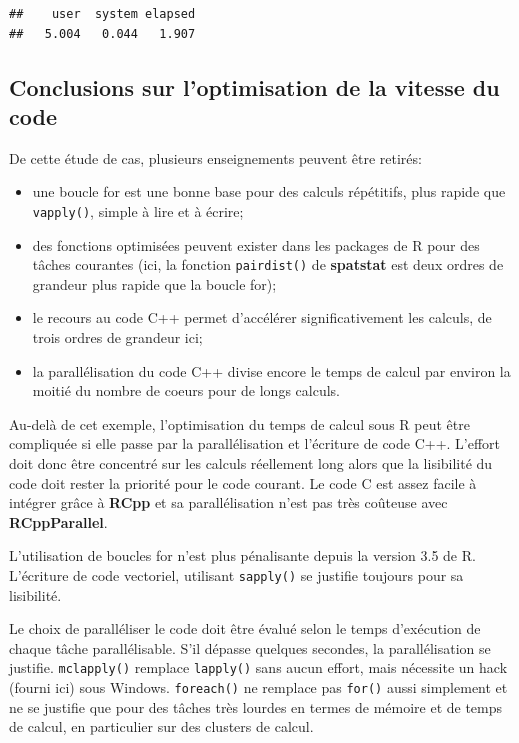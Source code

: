 \documentclass[
  12pt,
  french,
  a4paper,
  extrafontsizes,onecolumn,openright
  ]{memoir}
\providecommand{\tightlist}{%
  \setlength{\itemsep}{0pt}\setlength{\parskip}{0pt}}
\begin{document}
\begin{verbatim}
##    user  system elapsed 
##   5.004   0.044   1.907
\end{verbatim}

\normalsize

\hypertarget{conclusions-sur-loptimisation-de-la-vitesse-du-code}{%
\subsection{Conclusions sur l'optimisation de la vitesse du code}\label{conclusions-sur-loptimisation-de-la-vitesse-du-code}}

De cette étude de cas, plusieurs enseignements peuvent être retirés:

\begin{itemize}
\tightlist
\item
  une boucle for est une bonne base pour des calculs répétitifs, plus rapide que \texttt{vapply()}, simple à lire et à écrire;
\item
  des fonctions optimisées peuvent exister dans les packages de R pour des tâches courantes (ici, la fonction \texttt{pairdist()} de \textbf{spatstat} est deux ordres de grandeur plus rapide que la boucle for);
\item
  le recours au code C++ permet d'accélérer significativement les calculs, de trois ordres de grandeur ici;
\item
  la parallélisation du code C++ divise encore le temps de calcul par environ la moitié du nombre de coeurs pour de longs calculs.
\end{itemize}

Au-delà de cet exemple, l'optimisation du temps de calcul sous R peut être compliquée si elle passe par la parallélisation et l'écriture de code C++.
L'effort doit donc être concentré sur les calculs réellement long alors que la lisibilité du code doit rester la priorité pour le code courant.
Le code C est assez facile à intégrer grâce à \textbf{RCpp} et sa parallélisation n'est pas très coûteuse avec \textbf{RCppParallel}.

L'utilisation de boucles for n'est plus pénalisante depuis la version 3.5 de R.
L'écriture de code vectoriel, utilisant \texttt{sapply()} se justifie toujours pour sa lisibilité.

Le choix de paralléliser le code doit être évalué selon le temps d'exécution de chaque tâche parallélisable.
S'il dépasse quelques secondes, la parallélisation se justifie.
\texttt{mclapply()} remplace \texttt{lapply()} sans aucun effort, mais nécessite un hack (fourni ici) sous Windows.
\texttt{foreach()} ne remplace pas \texttt{for()} aussi simplement et ne se justifie que pour des tâches très lourdes en termes de mémoire et de temps de calcul, en particulier sur des clusters de calcul.
\end{document}
